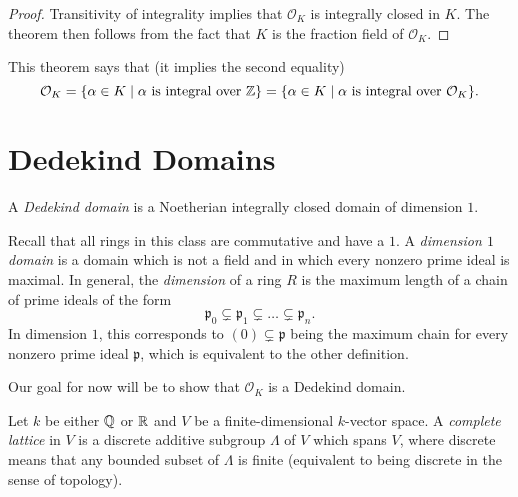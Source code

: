 \begin{proof}
  Transitivity of integrality implies that $\mathcal{O}_K$
  is integrally closed in $K$. The theorem then
  follows from the fact that $K$ is the fraction field
  of $\mathcal{O}_K$.
\end{proof}

\begin{remark}
  This theorem says that (it implies the second equality)
  \[
    \mathcal{O}_K
    = \{\alpha \in K \mid \text{$\alpha$ is integral over $\mathbb{Z}$}\}
    = \{\alpha \in K \mid \text{$\alpha$ is integral over $\mathcal{O}_K$}\}.
  \]
\end{remark}

\section{Dedekind Domains}

\begin{definition}
  A \emph{Dedekind domain} is a Noetherian
  integrally closed domain of dimension $1$.
\end{definition}

\begin{remark}
  Recall that all rings in this class are commutative
  and have a $1$. A \emph{dimension $1$ domain} is a
  domain
  which is not a field and in which every nonzero prime
  ideal
  is maximal. In general, the \emph{dimension} of a ring $R$
  is the maximum length of a chain of prime ideals
  of the form
  \[
    \mathfrak{p}_0 \subsetneq \mathfrak{p}_1 \subsetneq \dots \subsetneq \mathfrak{p}_n.
  \]
  In dimension $1$, this corresponds to
  $(0) \subsetneq \mathfrak{p}$ being the maximum
  chain for every nonzero prime
  ideal $\mathfrak{p}$, which is equivalent to the
  other definition.
\end{remark}

\begin{remark}
  Our goal for now will be to show that $\mathcal{O}_K$
  is a Dedekind domain.
\end{remark}

\begin{definition}
  Let $k$ be either $\mathbb{Q}$ or $\mathbb{R}$ and
  $V$ be a finite-dimensional $k$-vector
  space. A \emph{complete lattice} in $V$ is a
  discrete additive subgroup $\Lambda$ of $V$ which
  spans $V$, where discrete means that any
  bounded subset of $\Lambda$ is finite (equivalent to
  being discrete in the sense of topology).
\end{definition}

